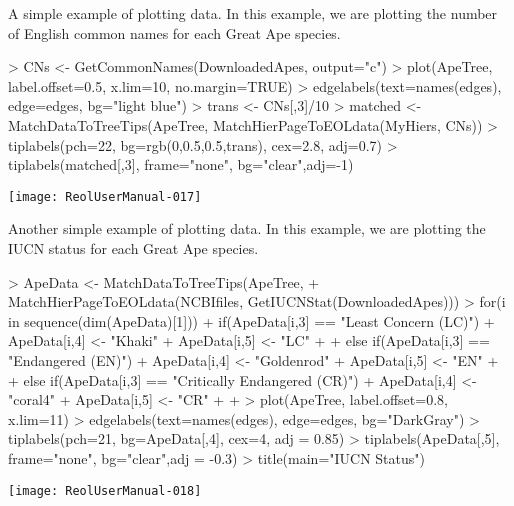 \documentclass[12pt]{article}
\begin{document}
A simple example of plotting data.  In this example, we are plotting the number of English common names for each Great Ape species.  
\begin {center}
\begin{Schunk}
\begin{Sinput}
> CNs <- GetCommonNames(DownloadedApes, output="c")
> plot(ApeTree, label.offset=0.5, x.lim=10, no.margin=TRUE)
> edgelabels(text=names(edges), edge=edges, bg="light blue")
> trans <- CNs[,3]/10
> matched <- MatchDataToTreeTips(ApeTree, MatchHierPageToEOLdata(MyHiers, CNs))
> tiplabels(pch=22, bg=rgb(0,0.5,0.5,trans), cex=2.8, adj=0.7)
> tiplabels(matched[,3], frame="none", bg="clear",adj=-1)
\end{Sinput}
\end{Schunk}
\texttt{[image: ReolUserManual-017]}
\end{center}

 
Another simple example of plotting data.  In this example, we are plotting the IUCN status for each Great Ape species.  
 \begin {center}
\begin{Schunk}
\begin{Sinput}
> ApeData <- MatchDataToTreeTips(ApeTree, 
+      MatchHierPageToEOLdata(NCBIfiles, GetIUCNStat(DownloadedApes)))
>   for(i in sequence(dim(ApeData)[1])) {
+     if(ApeData[i,3] == "Least Concern (LC)") {
+       ApeData[i,4] <- "Khaki"
+       ApeData[i,5] <- "LC"
+     }  
+     else if(ApeData[i,3] == "Endangered (EN)") {
+       ApeData[i,4] <- "Goldenrod"
+       ApeData[i,5] <- "EN"
+     }
+     else if(ApeData[i,3] == "Critically Endangered (CR)") {
+       ApeData[i,4] <- "coral4"
+       ApeData[i,5] <- "CR"
+     }
+   }
> plot(ApeTree, label.offset=0.8, x.lim=11)
> edgelabels(text=names(edges), edge=edges, bg="DarkGray")
> tiplabels(pch=21, bg=ApeData[,4], cex=4, adj = 0.85)
> tiplabels(ApeData[,5], frame="none", bg="clear",adj = -0.3)
> title(main="IUCN Status")
\end{Sinput}
\end{Schunk}
\texttt{[image: ReolUserManual-018]}
\end{center}

 
 
\end{document}
